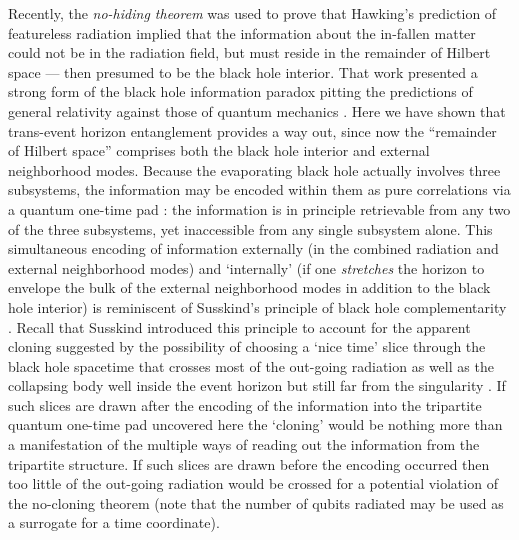 \documentclass[aps,12pt]{revtex4}
\begin{document}
Recently, the {\it no-hiding theorem} \cite{me,Kretschmann} was used to
prove that Hawking's prediction of featureless radiation implied that the
information about the in-fallen matter could not be in the radiation
field, but must reside in the remainder of Hilbert space --- then
presumed to be the black hole interior. That work presented a strong
form of the black hole information paradox pitting the predictions of
general relativity against those of quantum mechanics \cite{me}. Here
we have shown that trans-event horizon entanglement provides a way out,
since now the ``remainder of Hilbert space'' comprises both the black
hole interior and external neighborhood modes. Because the evaporating
black hole actually involves three subsystems, the information may be
encoded within them as pure correlations via a quantum one-time
pad \cite{me,Leung02}: the information is in principle retrievable from
any two of the three subsystems, yet inaccessible from any single
subsystem alone. This simultaneous encoding of information externally
(in the combined radiation and external neighborhood modes) and
`internally' (if one {\it stretches\/} the horizon to envelope the
bulk of the external neighborhood modes in addition to the black
hole interior) is reminiscent of Susskind's principle of black hole
complementarity \cite{Susskind93}. Recall that Susskind introduced
this principle to account for the apparent cloning suggested by the
possibility of choosing a `nice time' slice through the black hole
spacetime that crosses most of the out-going radiation as well as the
collapsing body well inside the event horizon but still far from the
singularity \cite{Lowe95}. If such slices are drawn after the
encoding of the information into the tripartite quantum one-time
pad uncovered here the `cloning' would be nothing more than a
manifestation of the multiple ways of reading out the information
from the tripartite structure. If such slices are drawn before the
encoding occurred then too little of the out-going radiation would be
crossed for a potential violation of the no-cloning theorem (note
that the number of qubits radiated may be used as a surrogate for a
time coordinate).

\end{document}
